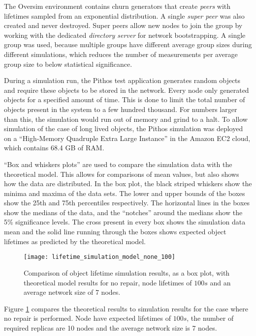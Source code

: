 The Oversim environment contains churn generators that create \emph{peers} with lifetimes sampled from an exponential distribution. A single \emph{super peer} was also created and never destroyed. Super peers allow new nodes to join the group by working with the dedicated \emph{directory server} for network bootstrapping. A single group was used, because multiple groups have different average group sizes during different simulations, which reduces the number of measurements per average group size to below statistical significance.

During a simulation run, the Pithos test application generates random objects and require these objects to be stored in the network. Every node only generated objects for a specified amount of time. This is done to limit the total number of objects present in the system to a few hundred thousand. For numbers larger than this, the simulation would run out of memory and grind to a halt. To allow simulation of the case of long lived objects, the Pithos simulation was deployed on a ``High-Memory Quadruple Extra Large Instance'' in the Amazon EC2 cloud, which contains 68.4 GB of RAM.

``Box and whiskers plots'' are used to compare the simulation data with the theoretical model. This allows for comparisons of mean values, but also shows how the data are distributed. In the box plot, the black striped whiskers show the minima and maxima of the data sets. The lower and upper bounds of the boxes show the 25th and 75th percentiles respectively. The horizontal lines in the boxes show the medians of the data, and the ``notches'' around the medians show the 5\% significance levels. The cross present in every box shows the simulation data mean and the solid line running through the boxes shows expected object lifetimes as predicted by the theoretical model.

\begin{figure}[htbp]
 \centering
 \texttt{[image: lifetime\_simulation\_model\_none\_100]}
 \caption{Comparison of object lifetime simulation results, as a box plot, with theoretical model results for no repair, node lifetimes of $100 s$ and an average network size of 7 nodes.}
 \label{fig_lifetime_simulation_model_none_100}
\end{figure}
%
Figure \ref{fig_lifetime_simulation_model_none_100} compares the theoretical results to simulation results for the case where no repair is performed. Node have expected lifetimes of $100 s$, the number of required replicas are 10 nodes and the average network size is 7 nodes.

